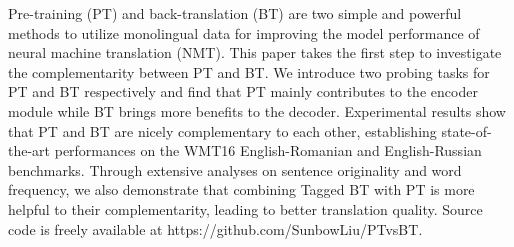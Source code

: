 Pre-training (PT) and back-translation (BT) are two simple and powerful methods to utilize monolingual data for improving the model performance of neural machine translation (NMT). This paper takes the first step to investigate the complementarity between PT and BT. We introduce two probing tasks for PT and BT respectively and find that PT mainly contributes to the encoder module while BT brings more benefits to the decoder. Experimental results show that PT and BT are nicely complementary to each other, establishing state-of-the-art performances on the WMT16 English-Romanian and English-Russian benchmarks. Through extensive analyses on sentence originality and word frequency, we also demonstrate that combining Tagged BT with PT is more helpful to their complementarity, leading to better translation quality. Source code is freely available at https://github.com/SunbowLiu/PTvsBT.

